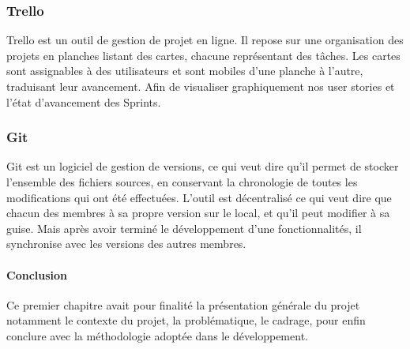 \subsubsection{Trello} %
\label{ssub:Trello}

Trello est un outil de gestion de projet en ligne. Il repose sur une organisation des projets en planches listant des cartes, chacune représentant des tâches. Les cartes sont assignables à des utilisateurs et sont mobiles d'une planche à l'autre, traduisant leur avancement. Afin de visualiser graphiquement nos user stories et l’état d'avancement des Sprints.


\subsubsection{Git} %
\label{ssub:git}

Git est un logiciel de gestion de versions, ce qui veut dire qu'il permet de stocker l’ensemble des fichiers sources, en conservant la chronologie de toutes les modifications qui ont été effectuées.\newline
L'outil est décentralisé ce qui veut dire que chacun des membres à sa propre version sur le local, et qu'il peut modifier à sa guise. Mais après avoir terminé le développement d'une fonctionnalités, il synchronise avec les versions des autres membres.

\paragraph{Conclusion} %
\label{par:conclusion}
Ce premier chapitre avait pour finalité la présentation générale du projet notamment le contexte du projet, la problématique, le cadrage, pour enfin conclure avec la méthodologie adoptée dans le développement.
